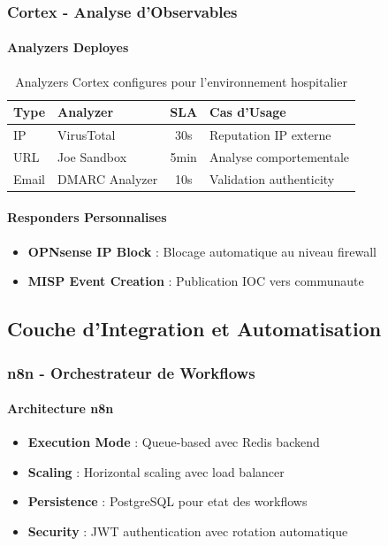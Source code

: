 \subsubsection{Cortex - Analyse d'Observables}

\paragraph{Analyzers Deployes}
\begin{table}[H]
    \centering
    \caption{Analyzers Cortex configures pour l'environnement hospitalier}
    \begin{tabular}{|l|l|c|l|}
        \hline
        \textbf{Type} & \textbf{Analyzer} & \textbf{SLA} & \textbf{Cas d'Usage}    \\
        \hline
        IP            & VirusTotal        & 30s          & Reputation IP externe   \\
        \hline
        URL           & Joe Sandbox       & 5min         & Analyse comportementale \\
        \hline
        Email         & DMARC Analyzer    & 10s          & Validation authenticity \\
        \hline
    \end{tabular}
\end{table}

\paragraph{Responders Personnalises}
\begin{itemize}
    \item \textbf{OPNsense IP Block} : Blocage automatique au niveau firewall
    \item \textbf{MISP Event Creation} : Publication IOC vers communaute
\end{itemize}

\subsection{Couche d'Integration et Automatisation}

\subsubsection{n8n - Orchestrateur de Workflows}

\paragraph{Architecture n8n}
\begin{itemize}
    \item \textbf{Execution Mode} : Queue-based avec Redis backend
    \item \textbf{Scaling} : Horizontal scaling avec load balancer
    \item \textbf{Persistence} : PostgreSQL pour etat des workflows
    \item \textbf{Security} : JWT authentication avec rotation automatique
\end{itemize}

